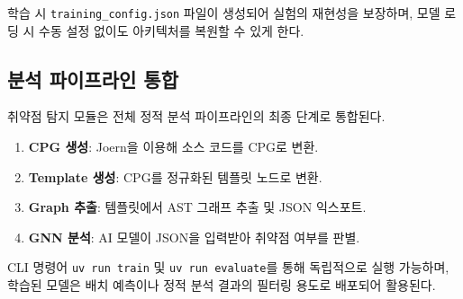 학습 시 \texttt{training\_config.json} 파일이 생성되어 실험의 재현성을 보장하며, 모델 로딩 시 수동 설정 없이도 아키텍처를 복원할 수 있게 한다.

\subsection{분석 파이프라인 통합}

취약점 탐지 모듈은 전체 정적 분석 파이프라인의 최종 단계로 통합된다.

\begin{enumerate}
    \item \textbf{CPG 생성}: Joern을 이용해 소스 코드를 CPG로 변환.
    \item \textbf{Template 생성}: CPG를 정규화된 템플릿 노드로 변환.
    \item \textbf{Graph 추출}: 템플릿에서 AST 그래프 추출 및 JSON 익스포트.
    \item \textbf{GNN 분석}: AI 모델이 JSON을 입력받아 취약점 여부를 판별.
\end{enumerate}

CLI 명령어 \texttt{uv run train} 및 \texttt{uv run evaluate}를 통해 독립적으로 실행 가능하며, 학습된 모델은 배치 예측이나 정적 분석 결과의 필터링 용도로 배포되어 활용된다.